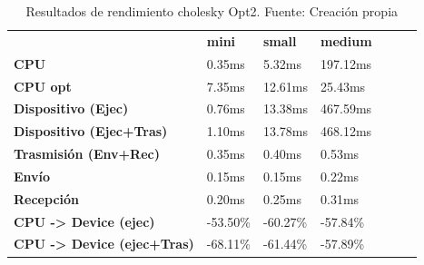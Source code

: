 \begin{table}[H]
    \centering
    \begin{tabular}{lllllll}
    \rowcolor[HTML]{DAE8FC} \ &  \textbf{mini} &  \textbf{	small} &  \textbf{	medium} \\
    \cellcolor[HTML]{DAE8FC} \textbf{CPU} & 0.35ms & 	5.32ms & 	197.12ms \\
    \rowcolor[HTML]{EFEFEF} \cellcolor[HTML]{DAE8FC} \textbf{CPU opt} & 7.35ms & 	12.61ms & 	25.43ms \\
    \cellcolor[HTML]{DAE8FC} \textbf{Dispositivo (Ejec)} & 0.76ms & 	13.38ms & 	467.59ms \\
    \rowcolor[HTML]{EFEFEF} \cellcolor[HTML]{DAE8FC} \textbf{Dispositivo (Ejec+Tras)} & 1.10ms & 	13.78ms & 	468.12ms \\
    \cellcolor[HTML]{DAE8FC} \textbf{Trasmisión (Env+Rec)} & 0.35ms & 	0.40ms & 	0.53ms \\
    \rowcolor[HTML]{EFEFEF} \cellcolor[HTML]{DAE8FC} \textbf{Envío} & 0.15ms & 	0.15ms & 	0.22ms \\
    \cellcolor[HTML]{DAE8FC} \textbf{Recepción} & 0.20ms & 	0.25ms & 	0.31ms \\
    \rowcolor[HTML]{EFEFEF} \cellcolor[HTML]{DAE8FC} \textbf{CPU -> Device (ejec)} & -53.50\% & 	-60.27\% & 	-57.84\% \\
    \cellcolor[HTML]{DAE8FC} \textbf{CPU -> Device (ejec+Tras)} & -68.11\% & 	-61.44\% & 	-57.89\% \\
    \end{tabular}
    \caption[Resultados de rendimiento cholesky Opt2]{{Resultados de rendimiento cholesky Opt2. Fuente: Creación propia}}
    \label{table_test_cholesky_Opt2_hw_performanceResults}
\end{table}
